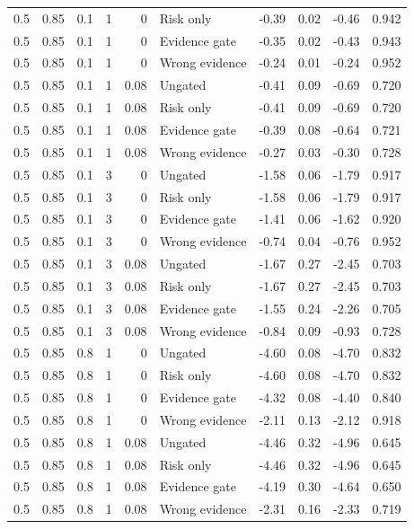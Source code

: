 \begin{longtable}{rrrrrlrrrr}
0.5 & 0.85 & 0.1 & 1 & 0 & Risk only & -0.39 & 0.02 & -0.46 & 0.942\\
0.5 & 0.85 & 0.1 & 1 & 0 & Evidence gate & -0.35 & 0.02 & -0.43 & 0.943\\
0.5 & 0.85 & 0.1 & 1 & 0 & Wrong evidence & -0.24 & 0.01 & -0.24 & 0.952\\
0.5 & 0.85 & 0.1 & 1 & 0.08 & Ungated & -0.41 & 0.09 & -0.69 & 0.720\\
0.5 & 0.85 & 0.1 & 1 & 0.08 & Risk only & -0.41 & 0.09 & -0.69 & 0.720\\
0.5 & 0.85 & 0.1 & 1 & 0.08 & Evidence gate & -0.39 & 0.08 & -0.64 & 0.721\\
0.5 & 0.85 & 0.1 & 1 & 0.08 & Wrong evidence & -0.27 & 0.03 & -0.30 & 0.728\\
0.5 & 0.85 & 0.1 & 3 & 0 & Ungated & -1.58 & 0.06 & -1.79 & 0.917\\
0.5 & 0.85 & 0.1 & 3 & 0 & Risk only & -1.58 & 0.06 & -1.79 & 0.917\\
0.5 & 0.85 & 0.1 & 3 & 0 & Evidence gate & -1.41 & 0.06 & -1.62 & 0.920\\
0.5 & 0.85 & 0.1 & 3 & 0 & Wrong evidence & -0.74 & 0.04 & -0.76 & 0.952\\
0.5 & 0.85 & 0.1 & 3 & 0.08 & Ungated & -1.67 & 0.27 & -2.45 & 0.703\\
0.5 & 0.85 & 0.1 & 3 & 0.08 & Risk only & -1.67 & 0.27 & -2.45 & 0.703\\
0.5 & 0.85 & 0.1 & 3 & 0.08 & Evidence gate & -1.55 & 0.24 & -2.26 & 0.705\\
0.5 & 0.85 & 0.1 & 3 & 0.08 & Wrong evidence & -0.84 & 0.09 & -0.93 & 0.728\\
0.5 & 0.85 & 0.8 & 1 & 0 & Ungated & -4.60 & 0.08 & -4.70 & 0.832\\
0.5 & 0.85 & 0.8 & 1 & 0 & Risk only & -4.60 & 0.08 & -4.70 & 0.832\\
0.5 & 0.85 & 0.8 & 1 & 0 & Evidence gate & -4.32 & 0.08 & -4.40 & 0.840\\
0.5 & 0.85 & 0.8 & 1 & 0 & Wrong evidence & -2.11 & 0.13 & -2.12 & 0.918\\
0.5 & 0.85 & 0.8 & 1 & 0.08 & Ungated & -4.46 & 0.32 & -4.96 & 0.645\\
0.5 & 0.85 & 0.8 & 1 & 0.08 & Risk only & -4.46 & 0.32 & -4.96 & 0.645\\
0.5 & 0.85 & 0.8 & 1 & 0.08 & Evidence gate & -4.19 & 0.30 & -4.64 & 0.650\\
0.5 & 0.85 & 0.8 & 1 & 0.08 & Wrong evidence & -2.31 & 0.16 & -2.33 & 0.719\\

\end{longtable}
